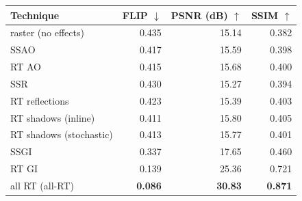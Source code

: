 \begin{tabular}{lrrr}
\toprule
Technique & FLIP $\downarrow$ & PSNR (dB) $\uparrow$ & SSIM $\uparrow$ \\
\midrule
raster (no effects)  & 0.435 & 15.14 & 0.382 \\
SSAO                 & 0.417 & 15.59 & 0.398 \\
RT AO                & 0.415 & 15.68 & 0.400 \\
SSR                  & 0.430 & 15.27 & 0.394 \\
RT reflections       & 0.423 & 15.39 & 0.403 \\
RT shadows (inline)  & 0.411 & 15.80 & 0.405 \\
RT shadows (stochastic) & 0.413 & 15.77 & 0.401 \\
SSGI                 & 0.337 & 17.65 & 0.460 \\
RT GI                & 0.139 & 25.36 & 0.721 \\
all RT (all-RT)      & \textbf{0.086} & \textbf{30.83} & \textbf{0.871} \\
\bottomrule
\end{tabular}
